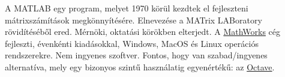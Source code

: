 A MATLAB egy program, melyet 1970 körül kezdtek el fejleszteni mátrixszámítások megkönnyítésére.
Elnevezése a MATrix LABoratory rövidítéséből ered. Mérnöki, oktatási körökben elterjedt.
A \href{http://www.mathworks.com}{MathWorks} cég fejleszti, évenkénti kiadásokkal, 
Windows, MacOS és Linux operációs rendszerekre. Nem ingyenes szoftver.
\vfil\eject
\Dnew
Fontos, hogy van szabad/ingyenes alternatíva, mely egy bizonyos szintű használatig egyenértékű: az 
\href{https://www.gnu.org/software/octave/download.html}{Octave}.